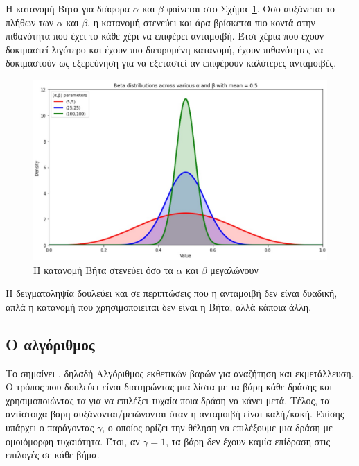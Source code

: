H κατανομή Βήτα για διάφορα $α$ και $β$ φαίνεται στο Σχήμα~\ref{fig:beta_distribution}. Όσο αυξάνεται το πλήθων των $α$ και $β$, η κατανομή στενεύει και άρα βρίσκεται πιο κοντά στην πιθανότητα που έχει το κάθε χέρι να επιφέρει ανταμοιβή. Έτσι χέρια που έχουν δοκιμαστεί λιγότερο και έχουν πιο διευρυμένη κατανομή, έχουν πιθανότητες να δοκιμαστούν ως εξερεύνηση για να εξεταστεί αν επιφέρουν καλύτερες ανταμοιβές.

\begin{figure}
    \centering
    \includegraphics[width=\textwidth]{body_matter/bandits/images/beta-distribution.jpg}
    \caption{Η κατανομή Βήτα στενεύει όσο τα $α$ και $β$ μεγαλώνουν}
    \label{fig:beta_distribution}
\end{figure}

Η δειγματοληψία  δουλεύει και σε περιπτώσεις που η ανταμοιβή δεν είναι δυαδική, απλά η κατανομή που χρησιμοποιειται δεν είναι η Βήτα, αλλά κάποια άλλη.

\subsection{Ο αλγόριθμος }

Το  σημαίνει , δηλαδή Αλγόριθμος εκθετικών βαρών για αναζήτηση και εκμετάλλευση. Ο τρόπος που δουλεύει είναι διατηρώντας μια λίστα με τα βάρη κάθε δράσης και χρησιμοποιώντας τα για να επιλέξει τυχαία ποια δράση να κάνει μετά. Τέλος, τα αντίστοιχα βάρη αυξάνονται/μειώνονται όταν η ανταμοιβή είναι καλή/κακή. Επίσης υπάρχει ο παράγοντας $γ$, ο οποίος ορίζει την θέληση να επιλέξουμε μια δράση με ομοιόμορφη τυχαιότητα. Έτσι, αν $γ=1$, τα βάρη δεν έχουν καμία επίδραση στις επιλογές σε κάθε βήμα.

